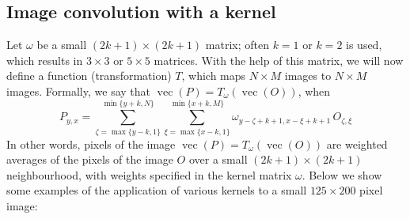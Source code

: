 \documentclass[10pt,a4paper]{article}
\theoremstyle{plain}
\theoremstyle{definition}
\DeclareMathOperator{\vc}{vec}
\begin{document}
\subsection*{Image convolution with a kernel}
Let \(\omega\) be a small \((2k+1) \times (2k+1)\) matrix; often \(k=1\) or \(k=2\) is used, which results in \(3\times 3\) or \(5\times 5\) matrices.
With the help of this matrix, we will now define a function (transformation) \(T\), which maps \(N \times M\) images to \(N \times M\) images.
Formally, we say that \(\vc(P)=T_\omega(\vc(O))\), when
\begin{equation}\label{eqbl}
  P_{y,x} =
  \sum_{\zeta=\max\{y-k,1\}}^{\min\{y+k,N\}}
  \sum_{\xi=\max\{x-k,1\}}^{\min\{x+k,M\}}
  \omega_{y-\zeta+k+1,x-\xi+k+1}\,
  O_{\zeta,\xi}
\end{equation}
In other words, pixels of the image \(\vc(P)=T_\omega(\vc(O))\) are weighted averages of the pixels of the image \(O\) over a small \((2k+1) \times (2k+1)\) neighbourhood,
with weights specified in the kernel matrix \(\omega\).
Below we show some examples of the application of various kernels to a small \(125\times 200\) pixel image:
\end{document}
